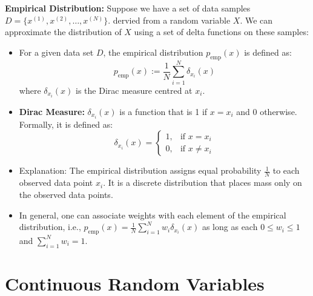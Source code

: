 \textbf{Empirical Distribution:} Suppose we have a set of data samples \(D = \{x^{(1)}, x^{(2)}, \ldots, x^{(N)}\}\). dervied from a random variable \(X\). We can approximate the distribution of \(X\) using a set of delta functions on these samples:
\begin{itemize}
    \item For a given data set \(D\), the empirical distribution \(p_{\text{emp}}(x)\) is defined as:
    \[
    p_{\text{emp}}(x) := \frac{1}{N} \sum_{i=1}^N \delta_{x_i}(x)
    \]
    where \(\delta_{x_i}(x)\) is the Dirac measure centred at \(x_i\).
    \item \textbf{Dirac Measure:} \(\delta_{x_i}(x)\) is a function that is 1 if \(x = x_i\) and 0 otherwise. Formally, it is defined as:
    \[
    \delta_{x_i}(x) = \begin{cases} 
    1, & \text{if } x = x_i \\
    0, & \text{if } x \neq x_i 
    \end{cases}
    \]
    \item Explanation: The empirical distribution assigns equal probability \( \frac{1}{N} \) to each observed data point \(x_i\). It is a discrete distribution that places mass only on the observed data points.
    \item In general, one can associate weights with each element of the empirical distribution, i.e., \(p_{\text{emp}}(x) = \frac{1}{N} \sum_{i=1}^N w_i \delta_{x_i}(x)\) as long as each \( 0 \leq w_i \leq 1 \) and \( \sum_{i=1}^N w_i = 1 \).
\end{itemize}

\section{Continuous Random Variables}

